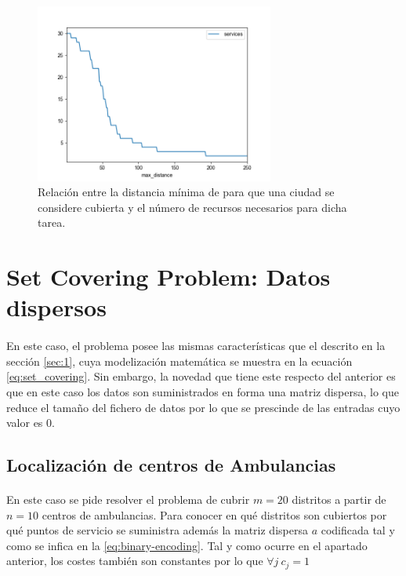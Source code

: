 \documentclass[spanish]{article}
\begin{document}
			\begin{figure}[h]
				\begin{center}
					\includegraphics[width=0.7\textwidth]{tema-2-p1-output}
				\end{center}
				\caption{Relación entre la distancia mínima de para que una ciudad se considere cubierta y el número de recursos necesarios para dicha tarea.}
				\label{fig:sol-1.2}
			\end{figure}

	\section{Set Covering Problem: Datos dispersos}
	\label{sec:2}

    \paragraph{}
		En este caso, el problema posee las mismas características que el descrito en la sección \ref{sec:1}, cuya modelización matemática se muestra en la ecuación \eqref{eq:set_covering}. Sin embargo, la novedad que tiene este respecto del anterior es que en este caso los datos son suministrados en forma una matriz dispersa, lo que reduce el tamaño del fichero de datos por lo que se prescinde de las entradas cuyo valor es $0$.

		\subsection{Localización de centros de Ambulancias}
		\label{sec:2.1}

			\paragraph{}
			En este caso se pide resolver el problema de cubrir $m = 20$ distritos a partir de $n = 10$ centros de ambulancias. Para conocer en qué distritos son cubiertos por qué puntos de servicio se suministra además la matriz dispersa $a$ codificada tal y como se infica en la \eqref{eq:binary-encoding}. Tal y como ocurre en el apartado anterior, los costes también son constantes por lo que $\forall j \ c_{j} = 1$
\end{document}
